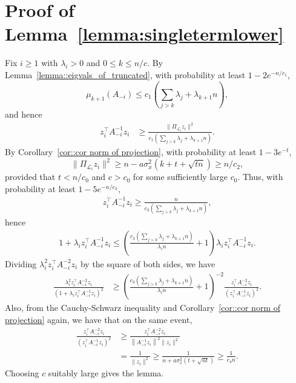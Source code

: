 \documentclass[11pt,notitlepage]{article}
\newcommand\Ls {\mathscr{L}}
\begin{document}
\section{Proof of Lemma~\ref{lemma:singletermlower}}
\label{appendix:singletermlower}

  Fix $i\ge 1$ with $\lambda_i > 0$
  and $0\le k\le n/c$. By Lemma~\ref{lemma::eigvals_of_truncated},
  with probability at least 
$1-2e^{-n/c_1}$,
    \[
      \mu_{k+1}(A_{-i})
      \le c_1\left(\sum_{j>k} \lambda_j + \lambda_{k+1}n\right),
    \]
  and hence
    \begin{align*}
      z_i^\top A_{-i}^{-1}z_i
        &\geq \frac{\|\Pi_{\Ls_i} z_i\|^2}
          {c_1\left( \sum_{j >k} \lambda_j + \lambda_{k+1}n\right)}.
    \end{align*}
  By Corollary~\ref{cor::cor norm of projection},
  with probability at least $1-3e^{-t}$,
    \[
      \|\Pi_{\Ls_i} z_i\|^2 \geq n-a\sigma_x^2(k + t + \sqrt{tn})\ge n/c_2,
    \]
    provided that $t < n/c_0$ and $c > c_0$ for some sufficiently large $c_0$.
  Thus, with probability at least 
$1-5e^{-n/c_3}$,
    \begin{align*}
      z_i^\top A_{-i}^{-1}z_i
      \geq \frac{ n} { c_3\left(\sum_{j >k} \lambda_j + \lambda_{k+1}n\right)},
    \end{align*}
  hence
    \begin{align*}
      1 + \lambda_i z_i^\top A_{-i}^{-1}z_i 
  \leq \left(\frac{c_3\left(\sum_{j >k} \lambda_j + \lambda_{k+1}n\right)}
          {\lambda_in} + 1\right)
          \lambda_i z_i^\top A_{-i}^{-1}z_i.
    \end{align*}
  Dividing $\lambda_i^2z_i^\top  A_{-i}^{-2}z_i$ by the square of both
  sides, we have
    \begin{align*}
      \frac{\lambda_i^2 z_i^\top  A_{-i}^{-2}z_i}
          {(1 + \lambda_i z_i^\top A_{-i}^{-1}z_i)^2}
        & \geq \left(\frac{c_3\left(\sum_{j >k} \lambda_j + \lambda_{k+1}n\right)}
          {\lambda_in} + 1\right)^{-2}
          \frac{z_i^\top A_{-i}^{-2}z_i}{(z_i^\top A_{-i}^{-1}z_i)^2}.
    \end{align*}
  Also, from the Cauchy-Schwarz inequality 
  and Corollary~\ref{cor::cor norm of projection} again,
  we have that 
  on the same event,
    \begin{align*}
      \frac{ z_i^\top  A_{-i}^{-2}z_i}{( z_i^\top A_{-i}^{-1}z_i)^2}
        &\geq \frac{ z_i^\top
        A_{-i}^{-2}z_i}{\left\|A_{-i}^{-1}z_i\right\|^2\|z_i\|^2} \\
        & = \frac{1}{\|z_i\|^2}
        \geq\frac{1}{n + a\sigma_x^2(t + \sqrt{nt})}
        \geq\frac{1}{c_4 n}.
    \end{align*}
  Choosing $c$ suitably large gives the lemma.
\end{document}
